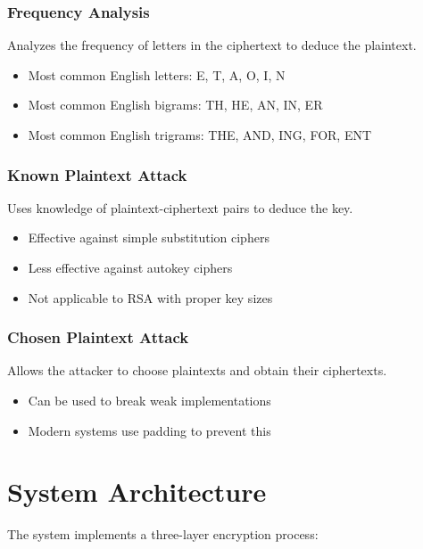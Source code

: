 \documentclass[12pt,a4paper]{article}
\begin{document}
\subsubsection{Frequency Analysis}
Analyzes the frequency of letters in the ciphertext to deduce the plaintext.
\begin{itemize}
    \item Most common English letters: E, T, A, O, I, N
    \item Most common English bigrams: TH, HE, AN, IN, ER
    \item Most common English trigrams: THE, AND, ING, FOR, ENT
\end{itemize}

\subsubsection{Known Plaintext Attack}
Uses knowledge of plaintext-ciphertext pairs to deduce the key.
\begin{itemize}
    \item Effective against simple substitution ciphers
    \item Less effective against autokey ciphers
    \item Not applicable to RSA with proper key sizes
\end{itemize}

\subsubsection{Chosen Plaintext Attack}
Allows the attacker to choose plaintexts and obtain their ciphertexts.
\begin{itemize}
    \item Can be used to break weak implementations
    \item Modern systems use padding to prevent this
\end{itemize}

\section{System Architecture}
The system implements a three-layer encryption process:
\end{document}
